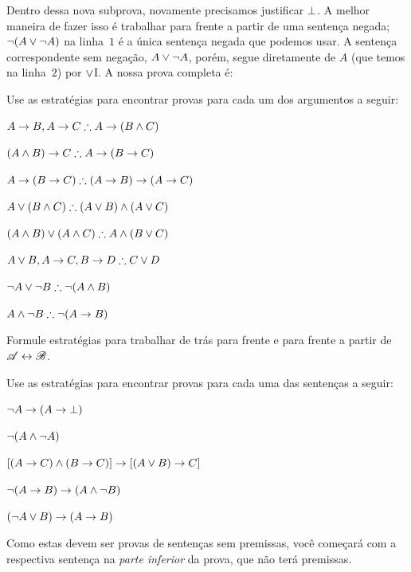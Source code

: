 Dentro dessa nova subprova, novamente precisamos justificar $\bot$. A melhor maneira de fazer isso é trabalhar para frente a partir de uma sentença negada; $\neg(A \vee \neg A)$ na linha~$1$ é a única sentença negada que podemos usar. A sentença correspondente sem negação, $A \vee \neg A$, porém, segue diretamente de $A$ (que temos na linha~$2$) por $\vee$I. A nossa prova completa é:
\begin{fitchproof}
	\open
	\AS
	\open
	\AS
	\close
	\close
\end{fitchproof}

\practiceproblems

\problempart
Use as estratégias para encontrar provas para cada um dos argumentos a seguir:
\begin{compactlist}
\item $A \eif B, A \eif C \therefore A \eif (B \eand C)$
\item $(A \eand B) \eif C \therefore A \eif (B \eif C)$
\item $A \eif (B \eif C) \therefore (A \eif B) \eif (A \eif C)$
\item $A \eor (B \eand C) \therefore (A \eor B) \eand (A \eor C)$
\item $(A \eand B) \eor (A \eand C) \therefore A \eand (B \eor C)$
\item $A \eor B, A \eif C, B \eif D \therefore C \eor D$
\item $\enot A \lor \enot B \therefore \enot(A \eand B)$
\item $A \eand \enot B \therefore \enot(A \eif B)$
\end{compactlist}

\problempart
Formule estratégias para trabalhar de trás para frente e para frente a partir de $\mathscr{A} \leftrightarrow \mathscr{B}$.

\problempart
Use as estratégias para encontrar provas para cada uma das sentenças a seguir:
\begin{compactlist}
\item $\neg A \rightarrow (A \rightarrow \bot)$
\item $\neg(A \wedge \neg A)$
\item $[(A \rightarrow C) \wedge (B \rightarrow C)] \rightarrow [(A \lor B) \rightarrow C]$
\item $\neg(A \rightarrow B) \rightarrow (A \wedge \neg B)$
\item $(\neg A \vee B) \rightarrow (A \rightarrow B)$
\end{compactlist}
Como estas devem ser provas de sentenças sem premissas, você começará com a respectiva sentença na \emph{parte inferior} da prova, que não terá premissas.

